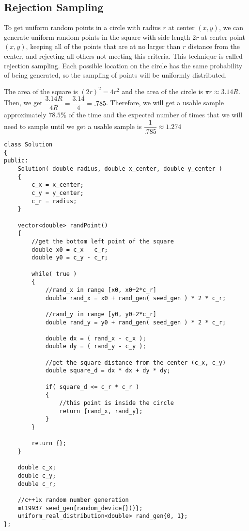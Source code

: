 \subsection{Rejection Sampling}
To get uniform random points in a circle with radius $r$ at center $(x,y)$, we can generate uniform random points in the square with side length $2r$ at center point$(x,y)$, keeping all of the points that are at no larger than $r$ distance from the center, and rejecting all others not meeting this criteria. This technique is called rejection sampling. Each possible location on the circle has the same probability of being generated, so the sampling of points will be uniformly distributed.

The area of the square is $(2r)^2 = 4r^2$ and the area of the circle is $\pi r \approx 3.14R$. Then, we get $\dfrac{3.14R}{4R} = \dfrac{3.14}{4} = .785$. Therefore, we will get a usable sample approximately $78.5\%$ of the time and the expected number of times that we will need to sample until we get a usable sample is $\dfrac{1}{.785} \approx 1.274 $

\begin{lstlisting}[style=customc, caption={Rejection Sampling}]
class Solution
{
public:
    Solution( double radius, double x_center, double y_center )
    {
        c_x = x_center;
        c_y = y_center;
        c_r = radius;
    }

    vector<double> randPoint()
    {
        //get the bottom left point of the square
        double x0 = c_x - c_r;
        double y0 = c_y - c_r;

        while( true )
        {
            //rand_x in range [x0, x0+2*c_r]
            double rand_x = x0 + rand_gen( seed_gen ) * 2 * c_r;

            //rand_y in range [y0, y0+2*c_r]
            double rand_y = y0 + rand_gen( seed_gen ) * 2 * c_r;

            double dx = ( rand_x - c_x );
            double dy = ( rand_y - c_y );

            //get the square distance from the center (c_x, c_y)
            double square_d = dx * dx + dy * dy;

            if( square_d <= c_r * c_r )
            {
                //this point is inside the circle
                return {rand_x, rand_y};
            }
        }

        return {};
    }

    double c_x;
    double c_y;
    double c_r;

    //c++1x random number generation
    mt19937 seed_gen{random_device{}()};
    uniform_real_distribution<double> rand_gen{0, 1};
};
\end{lstlisting}


